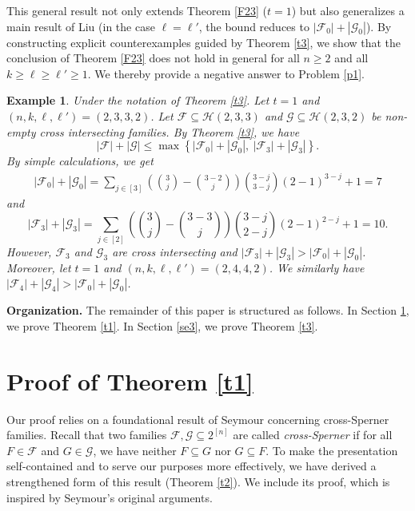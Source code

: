 \documentclass[11pt]{article}
\newtheorem{example}[theorem]{Example}
\begin{document}
This general result not only extends Theorem \ref{F23} ($t=1$) but also generalizes a main result of Liu \cite{L23} (in the case $\ell=\ell'$, the bound reduces to $|\mathcal{F}_0| + |\mathcal{G}_0|$).
By constructing explicit counterexamples guided by Theorem \ref{t3}, we show that the conclusion of Theorem \ref{F23} does not hold in general for all \( n \geq 2 \) and all \( k \ge \ell \ge \ell' \geq 1 \). We thereby provide a negative answer to Problem \ref{p1}.


\begin{example}\label{ex1}
Under the notation of Theorem \ref{t3}.
Let $t=1$ and $(n, k, \ell, \ell')=(2,3,3,2)$. 
Let $\mathcal{F}\subseteq\mathcal{H}(2,3,3)$ and $\mathcal{G}\subseteq\mathcal{H}(2,3,2)$ be non-empty cross intersecting families.
By Theorem \ref{t3}, we have
$$
 |\mathcal{F}|+ |\mathcal{G}|\le\max \left\{|\mathcal{F}_0|+|\mathcal{G}_0|,\ |\mathcal{F}_3|+|\mathcal{G}_3|\right\}.
$$
By simple calculations, we get
\begin{align*}
|\mathcal{F}_0|+|\mathcal{G}_0| =\sum\limits_{j\in[3]} 
     \left(\binom{3}{j}-\binom{3-2}{j}\right)\binom{3-j}{3-j}(2-1)^{3-j}+1=7
     \end{align*}
     and 
     \[ |\mathcal{F}_3|+|\mathcal{G}_3|=\sum\limits_{j\in[2]} 
     \left(\binom{3}{j}-\binom{3-3}{j}\right)\binom{3-j}{2-j}(2-1)^{2-j}+1=10. \]
However, $\mathcal{F}_3$ and $\mathcal{G}_3$ are cross intersecting and $|\mathcal{F}_3|+|\mathcal{G}_3|>|\mathcal{F}_0|+|\mathcal{G}_0|$.
Moreover, let $t=1$ and  $(n, k, \ell, \ell')=(2,4,4,2)$. We similarly have 
$|\mathcal{F}_4|+|\mathcal{G}_4|>|\mathcal{F}_0|+|\mathcal{G}_0|$.

\end{example}


\noindent 
{\bf Organization.} 
The remainder of this paper is structured as follows. In Section \ref{se2}, we prove Theorem \ref{t1}. In Section \ref{se3}, we prove Theorem \ref{t3}.



 
\section{Proof of Theorem \ref{t1}} \label{se2}

Our proof relies on a foundational result of Seymour \cite{Sey1973} concerning cross-Sperner families. Recall that two families $\mathcal{F},\mathcal{G}\subseteq 2^{[n]}$ are called \textit{cross-Sperner} if for all $F\in\mathcal{F}$ and $G\in\mathcal{G}$, we have neither $F\subseteq G$ nor $G\subseteq F$. To make the presentation self-contained and to serve our purposes more effectively, we have derived a strengthened form of this result (Theorem \ref{t2}). We include its proof, which is inspired by Seymour's original arguments.
\end{document}
